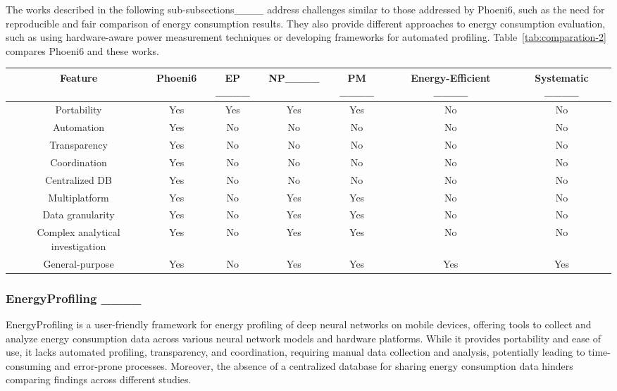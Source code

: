 The works described in the following sub-subsections____ address challenges similar to those addressed by Phoeni6, such as the need for reproducible and fair comparison of energy consumption results. They also provide different approaches to energy consumption evaluation, such as using hardware-aware power measurement techniques or developing frameworks for automated profiling. Table~\ref{tab:comparation-2} compares Phoeni6 and these works.

\begin{table*}[htbp]
\centering
\caption{Feature comparison between Phoeni6 and other frameworks, emphasizing advantages in portability and automation. EP = EnergyProfilin, NP = NeuralPower, PM = PowerMete.}
\begin{tabular}{|c|c|c|c|c|c|c|}
\hline
Feature & Phoeni6 & EP ____& NP____ & PM ____& Energy-Efficient ____ & Systematic ____\\
\hline
Portability & Yes & Yes & Yes & Yes & No & No \\\hline
Automation & Yes & No & No & No & No & No \\\hline
Transparency & Yes & No & No & No & No & No \\\hline
Coordination & Yes & No & No & No & No & No \\\hline
Centralized DB & Yes & No & No & No & No & No \\\hline
Multiplatform & Yes & No & Yes & Yes & No & No \\\hline
Data granularity & Yes & No & Yes & Yes & No & No \\\hline
Complex analytical investigation & Yes & No & Yes & Yes & No & No \\\hline
General-purpose & Yes & No & Yes & Yes & Yes & Yes \\
\hline
\end{tabular}
\label{tab:comparation-2}
\end{table*}

\subsubsection{EnergyProfiling ____} EnergyProfiling is a user-friendly framework for energy profiling of deep neural networks on mobile devices, offering tools to collect and analyze energy consumption data across various neural network models and hardware platforms. While it provides portability and ease of use, it lacks automated profiling, transparency, and coordination, requiring manual data collection and analysis, potentially leading to time-consuming and error-prone processes. Moreover, the absence of a centralized database for sharing energy consumption data hinders comparing findings across different studies.

